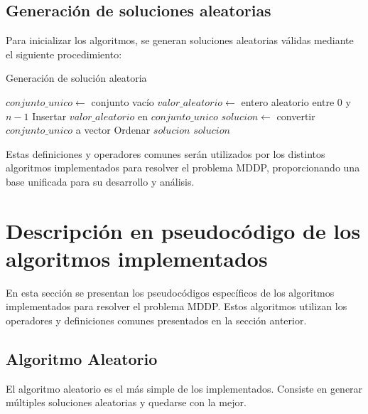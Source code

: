 \documentclass{article}
\begin{document}
\newpage

\subsection{Generación de soluciones aleatorias}

Para inicializar los algoritmos, se generan soluciones aleatorias válidas mediante el siguiente procedimiento:

\begin{algorithm}
\caption{Generación de solución aleatoria}
\begin{algorithmic}[1]
    \State $conjunto\_unico \gets$ conjunto vacío
        \State $valor\_aleatorio \gets$ entero aleatorio entre $0$ y $n-1$
        \State Insertar $valor\_aleatorio$ en $conjunto\_unico$
    \EndWhile
    \State $solucion \gets$ convertir $conjunto\_unico$ a vector
    \State Ordenar $solucion$
    \State \Return $solucion$
\EndFunction
\end{algorithmic}
\end{algorithm}

Estas definiciones y operadores comunes serán utilizados por los distintos algoritmos implementados para resolver el problema MDDP, proporcionando una base unificada para su desarrollo y análisis.

\newpage

\section{Descripción en pseudocódigo de los algoritmos implementados}

En esta sección se presentan los pseudocódigos específicos de los algoritmos implementados para resolver el problema MDDP. Estos algoritmos utilizan los operadores y definiciones comunes presentados en la sección anterior.

\subsection{Algoritmo Aleatorio}

El algoritmo aleatorio es el más simple de los implementados. Consiste en generar múltiples soluciones aleatorias y quedarse con la mejor.
\end{document}
